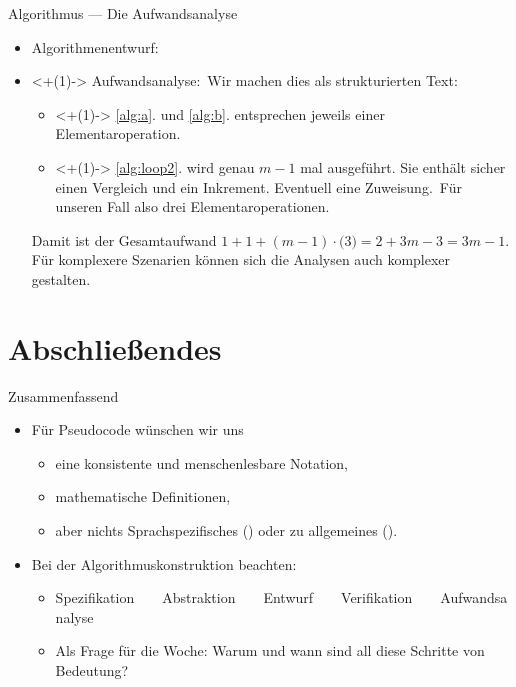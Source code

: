 \begin{frame}{Algorithmus --- Die Aufwandsanalyse}
\begin{itemize}[]
    \item Algorithmenentwurf: \\
    \usebox\algobox\vfill
    \item<+(1)-> Aufwandsanalyse:\pause\ Wir machen dies als strukturierten Text: \begin{itemize}
        \item<+(1)-> \ref{alg:a}. und \ref{alg:b}. entsprechen jeweils einer Elementaroperation.
        \item<+(1)-> \ref{alg:loop2}. wird genau \(m - 1\) mal ausgeführt. Sie enthält sicher einen Vergleich und ein Inkrement. Eventuell eine Zuweisung.\pause\ Für unseren Fall also drei Elementaroperationen.
    \end{itemize}
        \pause Damit ist der Gesamtaufwand \(1 + 1 + (m - 1) \cdot \bigl( 3 \bigr) = 2 + 3m - 3 = 3m - 1\).\medskip\\
        \pause Für komplexere Szenarien können sich die Analysen auch komplexer gestalten.
\end{itemize}
\end{frame}
\fi

\section{Abschließendes}
{\SummaryFrame
\begin{frame}[t]{Zusammenfassend}
\pause \printBibCommand
\vfill\vfill %
\begin{itemize}[<+(1)->]
    \itemsep16pt
    \item Für Pseudocode wünschen wir uns \begin{itemize}
        \item eine konsistente und menschenlesbare Notation,
        \item mathematische Definitionen,
        \item aber nichts Sprachspezifisches () oder zu allgemeines ().
    \end{itemize}
    \item Bei der Algorithmuskonstruktion beachten: \begin{itemize}
        \item \def\t{~~\faAngleRight~~}Spezifikation\t Abstraktion\t Entwurf\t Verifikation\t Aufwandsanalyse
        \item Als Frage für die Woche: Warum und wann sind all diese Schritte von Bedeutung?
    \end{itemize}
\end{itemize}
\end{frame}
}


\iffull\fi
